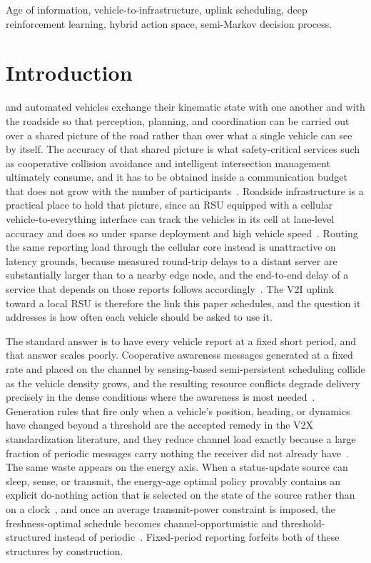 \documentclass[journal]{IEEEtran}
\begin{document}
\begin{IEEEkeywords}
Age of information, vehicle-to-infrastructure, uplink scheduling, deep reinforcement learning, hybrid action space, semi-Markov decision process.
\end{IEEEkeywords}

\section{Introduction}
 and automated vehicles exchange their kinematic state with one another and with the roadside so that perception, planning, and coordination can be carried out over a shared picture of the road rather than over what a single vehicle can see by itself. The accuracy of that shared picture is what safety-critical services such as cooperative collision avoidance and intelligent intersection management ultimately consume, and it has to be obtained inside a communication budget that does not grow with the number of participants~\cite{cai2023}. Roadside infrastructure is a practical place to hold that picture, since an RSU equipped with a cellular vehicle-to-everything interface can track the vehicles in its cell at lane-level accuracy and does so under sparse deployment and high vehicle speed~\cite{huang2024}. Routing the same reporting load through the cellular core instead is unattractive on latency grounds, because measured round-trip delays to a distant server are substantially larger than to a nearby edge node, and the end-to-end delay of a service that depends on those reports follows accordingly~\cite{zhang2024}. The V2I uplink toward a local RSU is therefore the link this paper schedules, and the question it addresses is how often each vehicle should be asked to use it.

The standard answer is to have every vehicle report at a fixed short period, and that answer scales poorly. Cooperative awareness messages generated at a fixed rate and placed on the channel by sensing-based semi-persistent scheduling collide as the vehicle density grows, and the resulting resource conflicts degrade delivery precisely in the dense conditions where the awareness is most needed~\cite{jung2025}. Generation rules that fire only when a vehicle's position, heading, or dynamics have changed beyond a threshold are the accepted remedy in the V2X standardization literature, and they reduce channel load exactly because a large fraction of periodic messages carry nothing the receiver did not already have~\cite{maksimovski2026}. The same waste appears on the energy axis. When a status-update source can sleep, sense, or transmit, the energy-age optimal policy provably contains an explicit do-nothing action that is selected on the state of the source rather than on a clock~\cite{gong2022}, and once an average transmit-power constraint is imposed, the freshness-optimal schedule becomes channel-opportunistic and threshold-structured instead of periodic~\cite{tang2020}. Fixed-period reporting forfeits both of these structures by construction.
\end{document}
